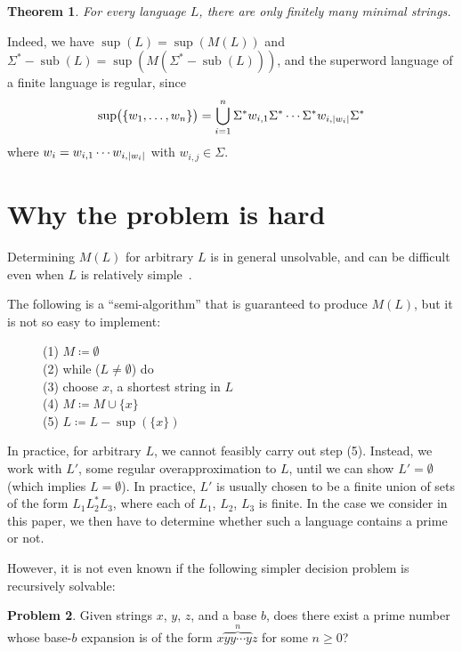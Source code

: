 \documentclass[12pt]{article}
\DeclarePairedDelimiter\abs{\lvert}{\rvert}
\DeclarePairedDelimiter\paren{\lparen}{\rparen}
\DeclareMathOperator\supe{sup}
\DeclareMathOperator\subb{sub}
\theoremstyle{plain}
\newtheorem{theorem}{Theorem}
\theoremstyle{definition}
\newtheorem{problem}[theorem]{Problem}
\newcommand{\0}{\mathtt{0}}
\newcommand{\1}{\mathtt{1}}
\newcommand{\2}{\mathtt{2}}
\newcommand{\3}{\mathtt{3}}
\newcommand{\4}{\mathtt{4}}
\newcommand{\5}{\mathtt{5}}
\newcommand{\6}{\mathtt{6}}
\newcommand{\7}{\mathtt{7}}
\newcommand{\8}{\mathtt{8}}
\newcommand{\9}{\mathtt{9}}
\newcommand{\union}{\cup}
\begin{document}
\begin{theorem}
For every language $L$, there are only finitely many minimal strings.
\end{theorem}

Indeed, we have $\supe(L) = \supe(M(L))$
and $\Sigma^* - \subb(L) = \supe(M(\Sigma^* - \subb(L)))$, and
the superword language of a finite language is regular, since
\[ \supe\paren[\big]{\{w_1,\dotsc,w_n\}} = \bigcup_{i=1}^n \Sigma^* w_{i,1} \Sigma^* \dotsm \Sigma^* w_{i,\abs{w_i}} \Sigma^* \]
where $w_i=w_{i,1}\dotsm w_{i,\abs{w_i}}$ with $w_{i,j}\in\Sigma$.

\section{Why the problem is hard}

Determining $M(L)$ for arbitrary $L$
is in general unsolvable, and can be difficult even when $L$
is relatively simple~\cite{GHK07,GHK09}.

The following is a ``semi-algorithm'' that 
is guaranteed to produce $M(L)$, but it is not so easy to implement:

\begin{figure}[H]
(1) $ M \coloneqq \emptyset$ \\
(2) while ($L \not= \emptyset$) do \\
\hphantom{} \qquad (3) choose $x$, a shortest string in $L$ \\
\hphantom{} \qquad (4) $ M \coloneqq M \union \lbrace  x \rbrace$ \\
\hphantom{} \qquad (5) $ L \coloneqq L - \supe(\lbrace x \rbrace) $
\end{figure}

In practice, for arbitrary $L$,
we cannot feasibly carry out step (5).  Instead, we work
with $L'$, some regular overapproximation to $L$, until we can show $L' =
\emptyset$ (which implies $L = \emptyset$).  In practice,
$L'$ is usually chosen to be a finite union of sets of the form 
$L_1 L_2^* L_3$, where each of $L_1$, $L_2$, $L_3$ is finite.
In the case we consider in this paper,
we then have to determine whether such a language contains
a prime or not.

However, it is not even known if the following simpler decision problem is 
recursively solvable:

\begin{problem}
Given strings $x$, $y$, $z$, and a base $b$, does there exist a prime
number whose base-$b$ expansion is of the form $x \overbrace{yy\cdots y}^n z$
for some $n \geq 0$?
\end{problem}
\end{document}
